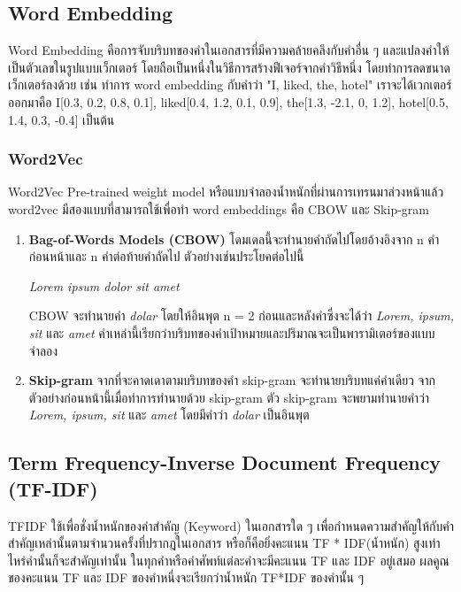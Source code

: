 \subsection{Word Embedding}
Word Embedding \cite{lukkiddd} คือการจับบริบทของคำในเอกสารที่มีความคล้ายคลึงกับคำอื่น ๆ และแปลงคำให้เป็นตัวเลขในรูปแบบเว็กเตอร์ โดยถือเป็นหนึ่งในวิธีการสร้างฟีเจอร์จากคำวิธีหนึ่ง โดยทำการลดขนาดเว็กเตอร์ลงด้วย เช่น ทำการ word embedding กับคำว่า "I, liked, the, hotel" เราจะได้เวกเตอร์ออกมาคือ I[0.3, 0.2, 0.8, 0.1], liked[0.4, 1.2, 0.1, 0.9], the[1.3, -2.1, 0, 1.2], hotel[0.5, 1.4, 0.3, -0.4] เป็นต้น

\subsubsection{Word2Vec}
Word2Vec \cite{lukkiddd} Pre-trained weight model หรือแบบจำลองน้ำหนักที่ผ่านการเทรนมาล่วงหน้าแล้ว word2vec มีสองแบบที่สามารถใช้เพื่อทำ word embeddings คือ CBOW และ Skip-gram
\begin{enumerate}
  \item \textbf{Bag-of-Words Models (CBOW)} โดมเดลนี้จะทำนายคำถัดไปโดยอ้างอิงจาก n คำก่อนหน้าและ n คำต่อท้ายคำถัดไป ตัวอย่างเช่นประโยคต่อไปนี้ 
  
  \centerline{\emph{Lorem ipsum dolor sit amet}}
  
  CBOW จะทำนายคำ \emph{dolar} โดยให้อินพุต n = 2 ก่อนและหลังคำซึ่งจะได้ว่า \emph{Lorem, ipsum, sit} และ \emph{amet} คำเหล่านี้เรียกว่าบริบทของคำเป้าหมายและปริมาณจะเป็นพารามิเตอร์ของแบบจำลอง

  \item \textbf{Skip-gram} จากที่จะคาดเดาตามบริบทของคำ skip-gram จะทำนายบริบทแค่คำเดียว จากตัวอย่างก่อนหน้านี้เมื่อทำการทำนายด้วย skip-gram ตัว skip-gram จะพยามทำนายคำว่า \emph{Lorem, ipsum, sit} และ \emph{amet} โดยมีคำว่า \emph{dolar} เป็นอินพุต
\end{enumerate}

\subsection{Term Frequency-Inverse Document Frequency (TF-IDF)}
TFIDF \cite{cory} ใช้เพื่อชั่งน้ำหนักของคำสำคัญ (Keyword) ในเอกสารใด ๆ เพื่อกำหนดความสำคัญให้กับคำสำคัญเหล่านั้นตามจำนวนครั้งที่ปรากฎในเอกสาร หรือก็คือยิ่งคะแนน TF * IDF(น้ำหนัก) สูงเท่าไหร่คำนั้นก็จะสำคัญเท่านั้น ในทุกคำหรือคำศัพท์แต่ละคำจะมีคะแนน TF และ IDF อยู่เสมอ ผลคูณของคะแนน TF และ IDF ของคำหนึ่งจะเรียกว่าน้ำหนัก TF*IDF ของคำนั้น ๆ
\newline

